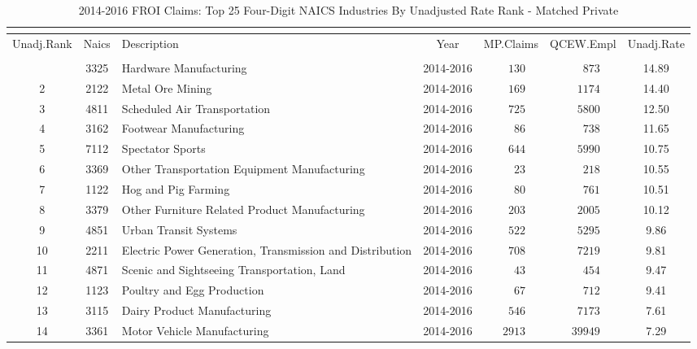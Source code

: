 \documentclass[9pt, oneside]{article}   	%
\begin{document}
\begin{longtable}{ccp{2.5in}cccc}
\caption{2014-2016 FROI Claims: Top 25 Four-Digit NAICS Industries By Unadjusted Rate Rank - Matched Private}\\ 
\label{Table: 10ccc}\\
\hline
\toprule
 Unadj.Rank & Naics & Description & Year & MP.Claims & QCEW.Empl & \multicolumn{1}{c}{Unadj.Rate} \\ 
   \midrule\\ [-1\normalbaselineskip]\hline\endhead\hline\endfoot
\hline
1 & 3325 & Hardware Manufacturing & 2014-2016 & $\phantom{00}130$ & $\phantom{000}873$ & 14.89 \\
2  & 2122 & Metal Ore Mining & 2014-2016 & $\phantom{00}169$ & $\phantom{00}1174$ & 14.40 \\
3  & 4811 & Scheduled Air Transportation & 2014-2016 & $\phantom{00}725$ & $\phantom{00}5800$ & 12.50 \\
4  & 3162 & Footwear Manufacturing & 2014-2016 & $\phantom{000}86$ & $\phantom{000}738$ & 11.65 \\
5  & 7112 & Spectator Sports & 2014-2016 & $\phantom{00}644$ & $\phantom{00}5990$ & 10.75 \\
6  & 3369 & Other Transportation Equipment Manufacturing & 2014-2016 & $\phantom{000}23$ & $\phantom{000}218$ & 10.55 \\
7  & 1122 & Hog and Pig Farming & 2014-2016 & $\phantom{000}80$ & $\phantom{000}761$ & 10.51 \\
8  & 3379 & Other Furniture Related Product Manufacturing & 2014-2016 & $\phantom{00}203$ & $\phantom{00}2005$ & 10.12 \\
9  & 4851 & Urban Transit Systems & 2014-2016 & $\phantom{00}522$ & $\phantom{00}5295$ &  9.86 \\
10  & 2211 & Electric Power Generation, Transmission and Distribution & 2014-2016 & $\phantom{00}708$ & $\phantom{00}7219$ &  9.81 \\
11  & 4871 & Scenic and Sightseeing Transportation, Land & 2014-2016 & $\phantom{000}43$ & $\phantom{000}454$ &  9.47 \\
12  & 1123 & Poultry and Egg Production & 2014-2016 & $\phantom{000}67$ & $\phantom{000}712$ &  9.41 \\
13  & 3115 & Dairy Product Manufacturing & 2014-2016 & $\phantom{00}546$ & $\phantom{00}7173$ &  7.61 \\
14  & 3361 & Motor Vehicle Manufacturing & 2014-2016 & $\phantom{0}2913$ & $\phantom{0}39949$ &  7.29 \\

\end{longtable}
\end{document}
